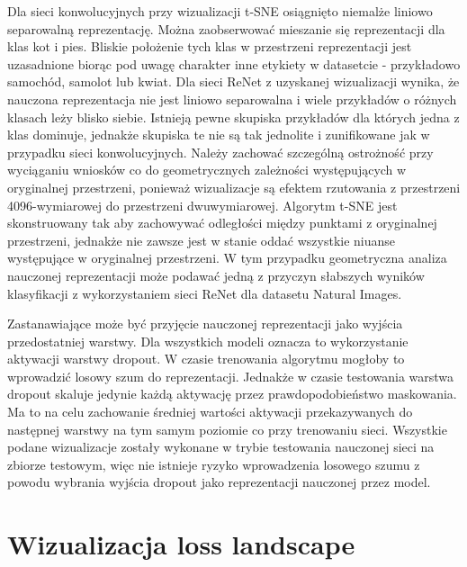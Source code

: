 \documentclass[oneside, mag]{mgr}
\begin{document}
Dla sieci konwolucyjnych przy wizualizacji t-SNE osiągnięto niemalże liniowo separowalną reprezentację. Można zaobserwować mieszanie się reprezentacji dla klas kot i pies. Bliskie położenie tych klas w przestrzeni reprezentacji jest uzasadnione biorąc pod uwagę charakter inne etykiety w datasetcie - przykładowo samochód, samolot lub kwiat. Dla sieci ReNet z uzyskanej wizualizacji wynika, że nauczona reprezentacja nie jest liniowo separowalna i wiele przykładów o różnych klasach leży blisko siebie. Istnieją pewne skupiska przykładów dla których jedna z klas dominuje, jednakże skupiska te nie są tak jednolite i zunifikowane jak w przypadku sieci konwolucyjnych.
Należy zachować szczególną ostrożność przy wyciąganiu wniosków co do geometrycznych zależności występujących w oryginalnej przestrzeni, ponieważ wizualizacje są efektem rzutowania z przestrzeni 4096-wymiarowej do przestrzeni dwuwymiarowej. Algorytm t-SNE jest skonstruowany tak aby zachowywać odległości między punktami z oryginalnej przestrzeni, jednakże nie zawsze jest w stanie oddać wszystkie niuanse występujące w oryginalnej przestrzeni. W tym przypadku geometryczna analiza nauczonej reprezentacji może podawać jedną z przyczyn słabszych wyników klasyfikacji z wykorzystaniem sieci ReNet dla datasetu Natural Images.

Zastanawiające może być przyjęcie nauczonej reprezentacji jako wyjścia przedostatniej warstwy. Dla wszystkich modeli oznacza to wykorzystanie aktywacji warstwy dropout. W czasie trenowania algorytmu mogłoby to wprowadzić losowy szum do reprezentacji. Jednakże w czasie testowania warstwa dropout skaluje jedynie każdą aktywację przez prawdopodobieństwo maskowania. Ma to na celu zachowanie średniej wartości aktywacji przekazywanych do następnej warstwy na tym samym poziomie co przy trenowaniu sieci. Wszystkie podane wizualizacje zostały wykonane w trybie testowania nauczonej sieci na zbiorze testowym, więc nie istnieje ryzyko wprowadzenia losowego szumu z powodu wybrania wyjścia dropout jako reprezentacji nauczonej przez model.

\section{Wizualizacja loss landscape}
\end{document}
